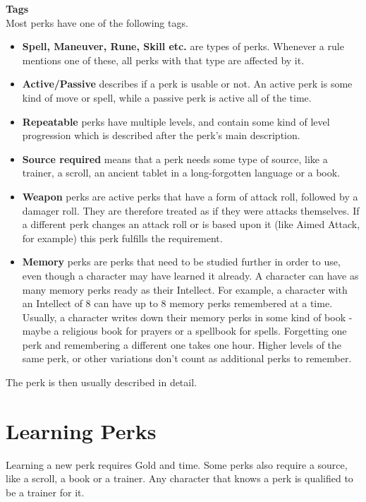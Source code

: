 \textbf{Tags}\\
Most perks have one of the following tags.\\
\begin{itemize}
	\item \textbf{Spell, Maneuver, Rune, Skill etc.} are types of perks. Whenever a rule mentions one of these, all perks with that type are affected by it.\\
	\item \textbf{Active/Passive} describes if a perk is usable or not. An active perk is some kind of move or spell, while a passive perk is active all of the time.\\
	\item \textbf{Repeatable} perks have multiple levels, and contain some kind of level progression which is described after the perk's main description.\\
	\item \textbf{Source required} means that a perk needs some type of source, like a trainer, a scroll, an ancient tablet in a long-forgotten language or a book.\\
	\item \textbf{Weapon} perks are active perks that have a form of attack roll, followed by a damager roll. They are therefore treated as if they were attacks themselves. If a different perk changes an attack roll or is based upon it (like Aimed Attack, for example) this perk fulfills the requirement.\\
	\item \textbf{Memory} perks are perks that need to be studied further in order to use, even though a character may have learned it already. A character can have as many memory perks ready as their Intellect. For example, a character with an Intellect of 8 can have up to 8 memory perks remembered at a time. Usually, a character writes down their memory perks in some kind of book - maybe a religious book for prayers or a spellbook for spells. Forgetting one perk and remembering a different one takes one hour. Higher levels of the same perk, or other variations don't count as additional perks to remember.
\end{itemize}

The perk is then usually described in detail.

\section{Learning Perks}
Learning a new perk requires Gold and time. Some perks also require a source, like a scroll, a book or a trainer. Any character that knows a perk is qualified to be a trainer for it.  

